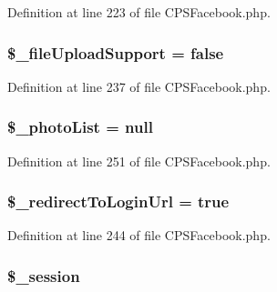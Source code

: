 Definition at line 223 of file CPSFacebook.php.

\hypertarget{classCPSFacebook_a851bf23affeafd6281b06ff919d23a7f}{
\subsubsection[{\$\_\-fileUploadSupport}]{\setlength{\rightskip}{0pt plus 5cm}\$\_\-fileUploadSupport = false}}
\label{classCPSFacebook_a851bf23affeafd6281b06ff919d23a7f}


Definition at line 237 of file CPSFacebook.php.

\hypertarget{classCPSFacebook_a7e2b66c375158928ec4cfa9de801ac0b}{
\subsubsection[{\$\_\-photoList}]{\setlength{\rightskip}{0pt plus 5cm}\$\_\-photoList = null}}
\label{classCPSFacebook_a7e2b66c375158928ec4cfa9de801ac0b}


Definition at line 251 of file CPSFacebook.php.

\hypertarget{classCPSFacebook_a26d05a26685e4c898e34328911b708d3}{
\subsubsection[{\$\_\-redirectToLoginUrl}]{\setlength{\rightskip}{0pt plus 5cm}\$\_\-redirectToLoginUrl = true}}
\label{classCPSFacebook_a26d05a26685e4c898e34328911b708d3}


Definition at line 244 of file CPSFacebook.php.

\hypertarget{classCPSFacebook_ad0641deaf4d314f034a134efaa6fbff0}{
\subsubsection[{\$\_\-session}]{\setlength{\rightskip}{0pt plus 5cm}\$\_\-session}}
\label{classCPSFacebook_ad0641deaf4d314f034a134efaa6fbff0}


